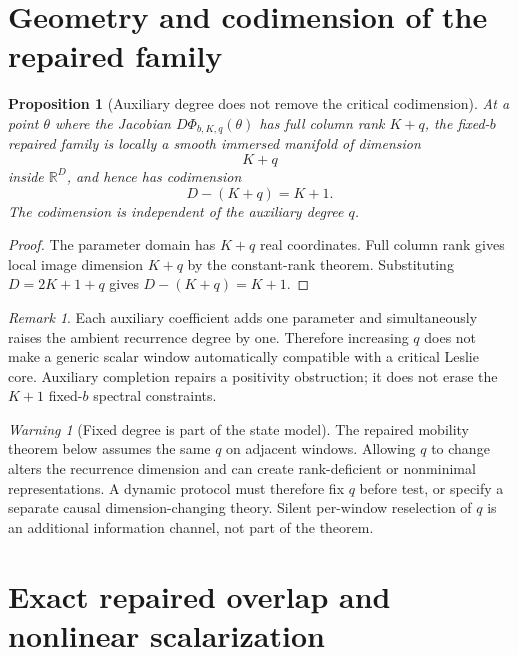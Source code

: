 \documentclass[11pt]{amsart}
\numberwithin{equation}{section}
\theoremstyle{plain}
\newtheorem{proposition}[theorem]{Proposition}
\theoremstyle{definition}
\theoremstyle{remark}
\newtheorem{remark}[theorem]{Remark}
\newtheorem{warning}[theorem]{Warning}
\begin{document}
\section{Geometry and codimension of the repaired family}
\label{sec:repaired_geometry}

\begin{proposition}[Auxiliary degree does not remove the critical codimension]
\label{prop:repaired_dimension}
At a point $\theta$ where the Jacobian $D\Phi_{b,K,q}(\theta)$ has full column rank $K+q$, the fixed-$b$ repaired family is locally a smooth immersed manifold of dimension
\begin{equation}K+q\label{eq:repaired_local_dimension}\end{equation}
inside $\mathbb R^D$, and hence has codimension
\begin{equation}D-(K+q)=K+1.\label{eq:repaired_codimension}\end{equation}
The codimension is independent of the auxiliary degree $q$.
\end{proposition}

\begin{proof}
The parameter domain has $K+q$ real coordinates. Full column rank gives local image dimension $K+q$ by the constant-rank theorem. Substituting $D=2K+1+q$ gives $D-(K+q)=K+1$.
\end{proof}

\begin{remark}
\label{rem:q_not_universal_fitter}
Each auxiliary coefficient adds one parameter and simultaneously raises the ambient recurrence degree by one. Therefore increasing $q$ does not make a generic scalar window automatically compatible with a critical Leslie core. Auxiliary completion repairs a positivity obstruction; it does not erase the $K+1$ fixed-$b$ spectral constraints.
\end{remark}

\begin{warning}[Fixed degree is part of the state model]
\label{warn:fixed_q_required}
The repaired mobility theorem below assumes the same $q$ on adjacent windows. Allowing $q$ to change alters the recurrence dimension and can create rank-deficient or nonminimal representations. A dynamic protocol must therefore fix $q$ before test, or specify a separate causal dimension-changing theory. Silent per-window reselection of $q$ is an additional information channel, not part of the theorem.
\end{warning}

\section{Exact repaired overlap and nonlinear scalarization}
\label{sec:repaired_overlap}
\end{document}
